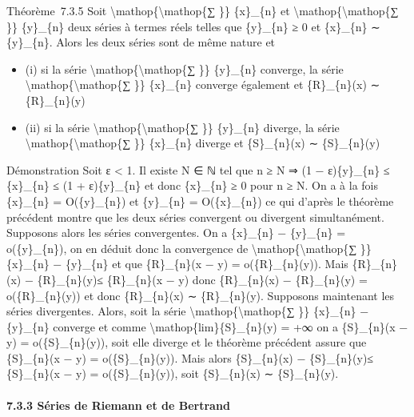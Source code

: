 \documentclass[]{article}
\begin{document}
Théorème~7.3.5 Soit \textbackslash{}mathop\{\textbackslash{}mathop\{∑
\}\} \{x\}\_\{n\} et \textbackslash{}mathop\{\textbackslash{}mathop\{∑
\}\} \{y\}\_\{n\} deux séries à termes réels telles que \{y\}\_\{n\} ≥ 0
et \{x\}\_\{n\} ∼ \{y\}\_\{n\}. Alors les deux séries sont de même
nature et

\begin{itemize}
\itemsep1pt\parskip0pt
\item
  (i) si la série \textbackslash{}mathop\{\textbackslash{}mathop\{∑ \}\}
  \{y\}\_\{n\} converge, la série
  \textbackslash{}mathop\{\textbackslash{}mathop\{∑ \}\} \{x\}\_\{n\}
  converge également et \{R\}\_\{n\}(x) ∼ \{R\}\_\{n\}(y)
\item
  (ii) si la série \textbackslash{}mathop\{\textbackslash{}mathop\{∑
  \}\} \{y\}\_\{n\} diverge, la série
  \textbackslash{}mathop\{\textbackslash{}mathop\{∑ \}\} \{x\}\_\{n\}
  diverge et \{S\}\_\{n\}(x) ∼ \{S\}\_\{n\}(y)
\end{itemize}

Démonstration Soit ε \textless{} 1. Il existe N ∈ ℕ tel que n ≥ N ⇒ (1 −
ε)\{y\}\_\{n\} ≤ \{x\}\_\{n\} ≤ (1 + ε)\{y\}\_\{n\} et donc \{x\}\_\{n\}
≥ 0 pour n ≥ N. On a à la fois \{x\}\_\{n\} = O(\{y\}\_\{n\}) et
\{y\}\_\{n\} = O(\{x\}\_\{n\}) ce qui d'après le théorème précédent
montre que les deux séries convergent ou divergent simultanément.
Supposons alors les séries convergentes. On a \textbar{}\{x\}\_\{n\} −
\{y\}\_\{n\}\textbar{} = o(\{y\}\_\{n\}), on en déduit donc la
convergence de \textbackslash{}mathop\{\textbackslash{}mathop\{∑ \}\}
\textbar{}\{x\}\_\{n\} − \{y\}\_\{n\}\textbar{} et que
\{R\}\_\{n\}(\textbar{}x − y\textbar{}) = o(\{R\}\_\{n\}(y)). Mais
\textbar{}\{R\}\_\{n\}(x) − \{R\}\_\{n\}(y)\textbar{}≤
\{R\}\_\{n\}(\textbar{}x − y\textbar{}) donc \textbar{}\{R\}\_\{n\}(x) −
\{R\}\_\{n\}(y)\textbar{} = o(\{R\}\_\{n\}(y)) et donc \{R\}\_\{n\}(x) ∼
\{R\}\_\{n\}(y). Supposons maintenant les séries divergentes. Alors,
soit la série \textbackslash{}mathop\{\textbackslash{}mathop\{∑ \}\}
\textbar{}\{x\}\_\{n\} − \{y\}\_\{n\}\textbar{} converge et comme
\textbackslash{}mathop\{lim\}\{S\}\_\{n\}(y) = +∞ on a
\{S\}\_\{n\}(\textbar{}x − y\textbar{}) = o(\{S\}\_\{n\}(y)), soit elle
diverge et le théorème précédent assure que \{S\}\_\{n\}(\textbar{}x −
y\textbar{}) = o(\{S\}\_\{n\}(y)). Mais alors \textbar{}\{S\}\_\{n\}(x)
− \{S\}\_\{n\}(y)\textbar{}≤ \{S\}\_\{n\}(\textbar{}x − y\textbar{}) =
o(\{S\}\_\{n\}(y)), soit \{S\}\_\{n\}(x) ∼ \{S\}\_\{n\}(y).

\paragraph{7.3.3 Séries de Riemann et de Bertrand}
\end{document}
